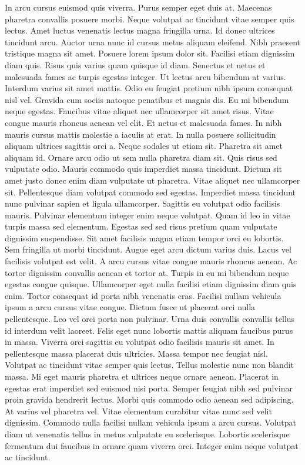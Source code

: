 In arcu cursus euismod quis viverra. Purus semper eget duis at. Maecenas pharetra convallis posuere morbi. Neque volutpat ac tincidunt vitae semper quis lectus. Amet luctus venenatis lectus magna fringilla urna. Id donec ultrices tincidunt arcu. Auctor urna nunc id cursus metus aliquam eleifend. Nibh praesent tristique magna sit amet. Posuere lorem ipsum dolor sit. Facilisi etiam dignissim diam quis. Risus quis varius quam quisque id diam. Senectus et netus et malesuada fames ac turpis egestas integer.
Ut lectus arcu bibendum at varius. Interdum varius sit amet mattis. Odio eu feugiat pretium nibh ipsum consequat nisl vel. Gravida cum sociis natoque penatibus et magnis dis. Eu mi bibendum neque egestas. Faucibus vitae aliquet nec ullamcorper sit amet risus. Vitae congue mauris rhoncus aenean vel elit. Et netus et malesuada fames. In nibh mauris cursus mattis molestie a iaculis at erat. In nulla posuere sollicitudin aliquam ultrices sagittis orci a. Neque sodales ut etiam sit. Pharetra sit amet aliquam id. Ornare arcu odio ut sem nulla pharetra diam sit. Quis risus sed vulputate odio. Mauris commodo quis imperdiet massa tincidunt. Dictum sit amet justo donec enim diam vulputate ut pharetra. Vitae aliquet nec ullamcorper sit.
Pellentesque diam volutpat commodo sed egestas. Imperdiet massa tincidunt nunc pulvinar sapien et ligula ullamcorper. Sagittis eu volutpat odio facilisis mauris. Pulvinar elementum integer enim neque volutpat. Quam id leo in vitae turpis massa sed elementum. Egestas sed sed risus pretium quam vulputate dignissim suspendisse. Sit amet facilisis magna etiam tempor orci eu lobortis. Sem fringilla ut morbi tincidunt. Augue eget arcu dictum varius duis. Lacus vel facilisis volutpat est velit. A arcu cursus vitae congue mauris rhoncus aenean. Ac tortor dignissim convallis aenean et tortor at. Turpis in eu mi bibendum neque egestas congue quisque. Ullamcorper eget nulla facilisi etiam dignissim diam quis enim. Tortor consequat id porta nibh venenatis cras. Facilisi nullam vehicula ipsum a arcu cursus vitae congue. Dictum fusce ut placerat orci nulla pellentesque.
Leo vel orci porta non pulvinar. Urna duis convallis convallis tellus id interdum velit laoreet. Felis eget nunc lobortis mattis aliquam faucibus purus in massa. Viverra orci sagittis eu volutpat odio facilisis mauris sit amet. In pellentesque massa placerat duis ultricies. Massa tempor nec feugiat nisl. Volutpat ac tincidunt vitae semper quis lectus. Tellus molestie nunc non blandit massa. Mi eget mauris pharetra et ultrices neque ornare aenean. Placerat in egestas erat imperdiet sed euismod nisi porta. Semper feugiat nibh sed pulvinar proin gravida hendrerit lectus. Morbi quis commodo odio aenean sed adipiscing. At varius vel pharetra vel. Vitae elementum curabitur vitae nunc sed velit dignissim. Commodo nulla facilisi nullam vehicula ipsum a arcu cursus. Volutpat diam ut venenatis tellus in metus vulputate eu scelerisque. Lobortis scelerisque fermentum dui faucibus in ornare quam viverra orci. Integer enim neque volutpat ac tincidunt.
